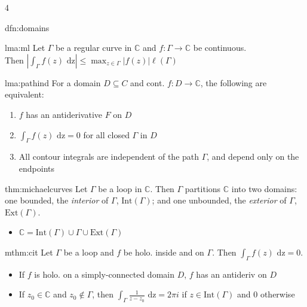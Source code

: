 \documentclass[landscape, 8pt]{extarticle}
\begin{document}
\begin{multicols*}{4}
\begin{dfn}[Domains]{dfn:domains}{ }
		
	\end{dfn}
	
	
	\begin{lma}{lma:ml}{ }
		Let $\Gamma$ be a regular curve in $\mathbb{C}$ and $f: \Gamma \to \mathbb{C}$ be continuous.\\
		Then $\left|\int_{\Gamma}f(z) \text{ dz}\right| \le \max_{z \in \Gamma}\left|f(z)\right| \ell(\Gamma)$
		
	\end{lma}
	
	
	\begin{lma}{lma:pathind}{ }
		For a domain $D \subseteq C$ and cont. $f: D \to \mathbb{C}$, the following are equivalent:
		\begin{enumerate}[label = (\roman*)]
			\item $f$ has an antiderivative $F$ on $D$
			\item $\int_{\Gamma} f(z) \text{ dz} = 0$ for all closed $\Gamma$ in $D$
			\item All contour integrals are independent of the path $\Gamma$, and depend only on the endpoints
		\end{enumerate}
		
	\end{lma}
	
	
	\begin{thm}{thm:michaelcurves}{ }
		Let $\Gamma$ be a loop in $\mathbb{C}$. Then $\Gamma$ partitions $\mathbb{C}$ into two domains: one bounded, the \textit{interior} of $\Gamma$, $\text{Int}(\Gamma)$; and one unbounded, the \textit{exterior} of $\Gamma$, $\text{Ext}(\Gamma)$.
		\begin{itemize}
			\item $\mathbb{C} = \text{Int}(\Gamma) \cup \Gamma \cup \text{Ext}(\Gamma)$
		\end{itemize}
		
		
	\end{thm}
	
	
	\begin{mthm}{mthm:cit}{ }
		Let $\Gamma$ be a loop and $f$ be holo. inside and on $\Gamma$. Then 
		$
		\int_{\Gamma}f(z) \text{ dz} = 0.
		$
		\begin{itemize}
			\item If $f$ is holo. on a simply-connected domain $D$, $f$ has an antideriv on $D$
			\item If $z_0 \in \mathbb{C}$ and $z_0 \notin \Gamma$, then $\int_{\Gamma} \frac{1}{z - z_0} \text{ dz} = 2\pi i$ if $z \in \text{Int}(\Gamma)$ and 0 otherwise
		\end{itemize}
	\end{mthm}
	

\end{multicols*}
\end{document}
